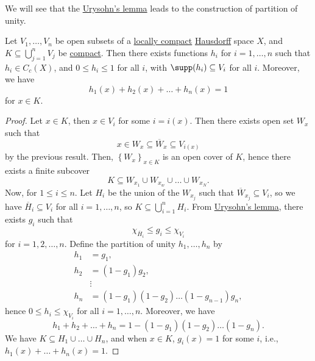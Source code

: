We will see that the \hyperref[thm:Urysohn-lemma]{Urysohn's lemma} leads to the construction of partition of unity.

\begin{theorem}
	Let \(V_1, \dots , V_n\) be open subsets of a \hyperref[def:locally-compact]{locally compact} \hyperref[def:Hausdorff]{Hausdorff} space \(X\), and \(K \subseteq \bigcup_{j=1}^{n} V_j\) be \hyperref[def:compact]{compact}. Then there exists functions \(h_i\) for \(i = 1, \dots  , n\) such that \(h_i \in C_c(X)\), and \(0 \leq h_i \leq 1\) for all \(i\), with \(\supp(h_i) \subseteq V_i\) for all \(i\). Moreover, we have
	\[
		h_1 (x) + h_2(x) + \dots  + h_n(x) = 1
	\]
	for \(x\in K\).
\end{theorem}
\begin{proof}
	Let \(x\in K\), then \(x\in V_i\) for some \(i = i(x)\). Then there exists open set \(W_x\) such that
	\[
		x\in W_x \subseteq \overline{W} _x \subseteq V_{i(x)}
	\]
	by the previous result. Then, \(\left\{ W_x \right\} _{x\in K}\) is an open cover of \(K\), hence there exists a finite subcover
	\[
		K \subseteq W_{x_1} \cup W_{x_w} \cup \dots \cup W_{x_N}.
	\]
	Now, for \(1 \leq i \leq n\). Let \(H_i\) be the union of the \(W_{x_j}\) such that \(\overline{W} _{x_j} \subseteq V_i\), so we have \(\overline{H} _i \subseteq V_i\) for all \(i = 1, \dots  , n\), so \(K \subseteq \bigcup_{i=1}^{n} H_i\). From \hyperref[thm:Urysohn-lemma]{Urysohn's lemma}, there exists \(g_i\) such that
	\[
		\chi _{\overline{H} _i} \leq g_i \leq \chi _{V_i}
	\]
	for \(i = 1, 2, \dots  , n\). Define the partition of unity \(h_1, \dots, h_n\) by
	\[
		\begin{split}
			h_1 & = g_1,                                   \\
			h_2 & = (1-g_1)g_2,                            \\
			    & \vdots                                   \\
			h_n & = (1-g_1)(1-g_2) \dots  (1-g_{n-1}) g_n,
		\end{split}
	\]
	hence \(0 \leq h_i \leq \chi _{V_i}\) for all \(i = 1, \dots  , n\). Moreover, we have
	\[
		h_1 + h_2 + \dots  + h_n = 1 - (1-g_1)(1-g_2)\dots  (1-g_n).
	\]
	We have \(K \subseteq H_1 \cup \dots  \cup H_n\), and when \(x\in K\), \(g_i(x) = 1\) for some \(i\), i.e., \(h_1 (x) + \dots  + h_n(x) = 1\).
\end{proof}

